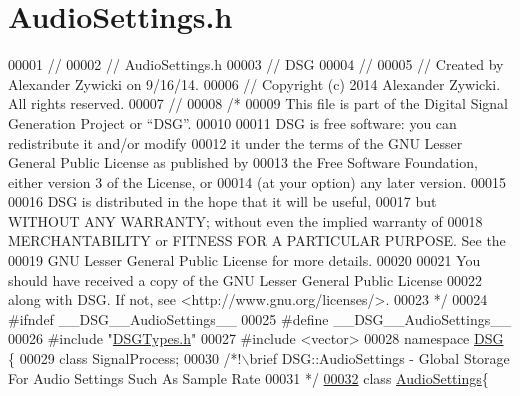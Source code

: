 \hypertarget{_audio_settings_8h_source}{\section{Audio\+Settings.\+h}
\label{_audio_settings_8h_source}
}

\begin{DoxyCode}
00001 \textcolor{comment}{//}
00002 \textcolor{comment}{//  AudioSettings.h}
00003 \textcolor{comment}{//  DSG}
00004 \textcolor{comment}{//}
00005 \textcolor{comment}{//  Created by Alexander Zywicki on 9/16/14.}
00006 \textcolor{comment}{//  Copyright (c) 2014 Alexander Zywicki. All rights reserved.}
00007 \textcolor{comment}{//}
00008 \textcolor{comment}{/*}
00009 \textcolor{comment}{ This file is part of the Digital Signal Generation Project or “DSG”.}
00010 \textcolor{comment}{}
00011 \textcolor{comment}{ DSG is free software: you can redistribute it and/or modify}
00012 \textcolor{comment}{ it under the terms of the GNU Lesser General Public License as published by}
00013 \textcolor{comment}{ the Free Software Foundation, either version 3 of the License, or}
00014 \textcolor{comment}{ (at your option) any later version.}
00015 \textcolor{comment}{}
00016 \textcolor{comment}{ DSG is distributed in the hope that it will be useful,}
00017 \textcolor{comment}{ but WITHOUT ANY WARRANTY; without even the implied warranty of}
00018 \textcolor{comment}{ MERCHANTABILITY or FITNESS FOR A PARTICULAR PURPOSE.  See the}
00019 \textcolor{comment}{ GNU Lesser General Public License for more details.}
00020 \textcolor{comment}{}
00021 \textcolor{comment}{ You should have received a copy of the GNU Lesser General Public License}
00022 \textcolor{comment}{ along with DSG.  If not, see <http://www.gnu.org/licenses/>.}
00023 \textcolor{comment}{ */}
00024 \textcolor{preprocessor}{#ifndef \_\_DSG\_\_AudioSettings\_\_}
00025 \textcolor{preprocessor}{#define \_\_DSG\_\_AudioSettings\_\_}
00026 \textcolor{preprocessor}{#include "\hyperlink{_d_s_g_types_8h}{DSGTypes.h}"}
00027 \textcolor{preprocessor}{#include <vector>}
00028 \textcolor{keyword}{namespace }\hyperlink{namespace_d_s_g}{DSG} \{
00029     \textcolor{keyword}{class }SignalProcess;\textcolor{comment}{}
00030 \textcolor{comment}{    /*!\(\backslash\)brief DSG::AudioSettings - Global Storage For Audio Settings Such As Sample Rate}
00031 \textcolor{comment}{     */}
\hypertarget{_audio_settings_8h_source_l00032}{}\hyperlink{class_d_s_g_1_1_audio_settings}{00032}     \textcolor{keyword}{class }\hyperlink{class_d_s_g_1_1_audio_settings}{AudioSettings}\{

\end{DoxyCode}
